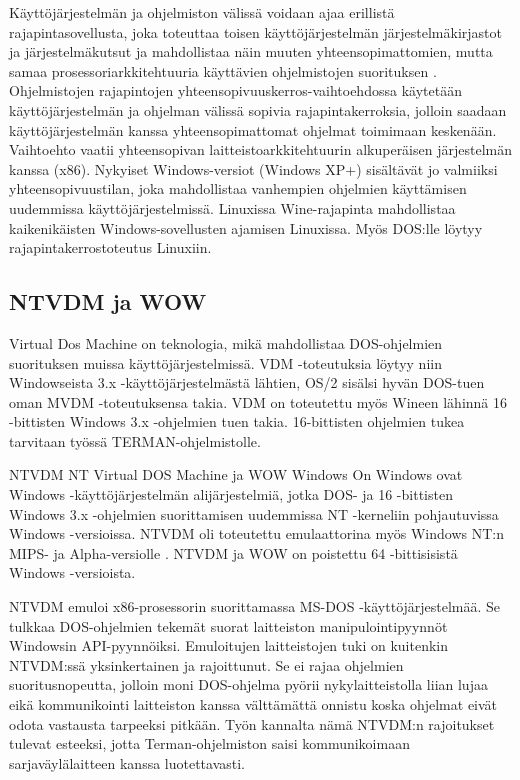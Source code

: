 


Käyttöjärjestelmän ja ohjelmiston välissä voidaan ajaa erillistä rajapintasovellusta, joka toteuttaa toisen käyttöjärjestelmän järjestelmäkirjastot ja järjestelmäkutsut ja mahdollistaa näin muuten yhteensopimattomien, mutta samaa prosessoriarkkitehtuuria käyttävien ohjelmistojen suorituksen \cite{ntvdm_kb}. Ohjelmistojen rajapintojen yhteensopivuuskerros-vaihtoehdossa  käytetään käyttöjärjestelmän ja ohjelman välissä sopivia rajapintakerroksia, jolloin saadaan käyttöjärjestelmän kanssa yhteensopimattomat ohjelmat toimimaan keskenään. Vaihtoehto vaatii yhteensopivan laitteistoarkkitehtuurin alkuperäisen järjestelmän kanssa (x86). Nykyiset Windows-versiot (Windows XP+) sisältävät jo valmiiksi yhteensopivuustilan, joka mahdollistaa vanhempien ohjelmien käyttämisen uudemmissa käyttöjärjestelmissä. Linuxissa Wine-rajapinta mahdollistaa kaikenikäisten Windows-sovellusten ajamisen Linuxissa. Myös DOS:lle löytyy rajapintakerrostoteutus Linuxiin.

\subsection{NTVDM ja WOW}

Virtual Dos Machine on teknologia, mikä mahdollistaa DOS-ohjelmien suorituksen muissa käyttöjärjestelmissä. VDM -toteutuksia löytyy niin Windowseista 3.x -käyttöjärjestelmästä lähtien, OS/2 sisälsi hyvän DOS-tuen oman MVDM -toteutuksensa takia. VDM on toteutettu myös Wineen lähinnä 16 -bittisten Windows 3.x -ohjelmien tuen takia. 16-bittisten ohjelmien tukea tarvitaan työssä TERMAN-ohjelmistolle.

NTVDM NT Virtual DOS Machine ja WOW Windows On Windows ovat Windows -käyttöjärjestelmän alijärjestelmiä, jotka DOS- ja 16 -bittisten Windows 3.x -ohjelmien suorittamisen uudemmissa NT -kerneliin pohjautuvissa Windows -versioissa. NTVDM oli toteutettu emulaattorina myös Windows NT:n MIPS- ja Alpha-versiolle . NTVDM ja WOW on poistettu 64 -bittisisistä Windows -versioista. \cite{ntvdm_2}

NTVDM emuloi x86-prosessorin suorittamassa MS-DOS -käyttöjärjestelmää. Se tulkkaa DOS-ohjelmien tekemät suorat laitteiston manipulointipyynnöt Windowsin API-pyynnöiksi. Emuloitujen laitteistojen tuki on kuitenkin NTVDM:ssä yksinkertainen ja rajoittunut. Se ei rajaa ohjelmien suoritusnopeutta, jolloin moni DOS-ohjelma pyörii nykylaitteistolla liian lujaa eikä kommunikointi laitteiston kanssa välttämättä onnistu koska ohjelmat eivät odota vastausta tarpeeksi pitkään. Työn kannalta nämä NTVDM:n rajoitukset tulevat esteeksi, jotta Terman-ohjelmiston saisi kommunikoimaan sarjaväylälaitteen kanssa luotettavasti.

